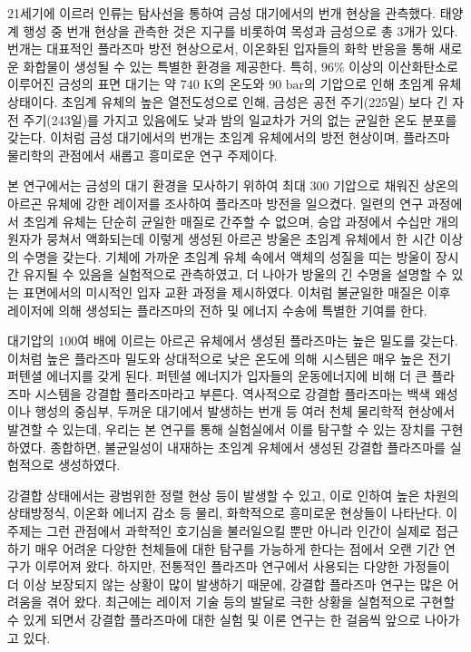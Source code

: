 
21세기에 이르러 인류는 탐사선을 통하여 금성 대기에서의 번개 현상을 관측했다. 태양계 행성 중 번개 현상을 관측한 것은 지구를 비롯하여 목성과 금성으로 총 3개가 있다. 번개는 대표적인 플라즈마 방전 현상으로서, 이온화된 입자들의 화학 반응을 통해 새로운 화합물이 생성될 수 있는 특별한 환경을 제공한다. 특히, $96\%$ 이상의 이산화탄소로 이루어진 금성의 표면 대기는 약 $740 \text{ K}$의 온도와 $90 \text{ bar}$의 기압으로 인해 초임계 유체 상태이다. 초임계 유체의 높은 열전도성으로 인해, 금성은 공전 주기(225일) 보다 긴 자전 주기(243일)를 가지고 있음에도 낮과 밤의 일교차가 거의 없는 균일한 온도 분포를 갖는다. 이처럼 금성 대기에서의 번개는 초임계 유체에서의 방전 현상이며, 플라즈마 물리학의 관점에서 새롭고 흥미로운 연구 주제이다.

본 연구에서는 금성의 대기 환경을 모사하기 위하여 최대 300 기압으로 채워진 상온의 아르곤 유체에 강한 레이저를 조사하여 플라즈마 방전을 일으켰다. 일련의 연구 과정에서 초임계 유체는 단순히 균일한 매질로 간주할 수 없으며, 승압 과정에서 수십만 개의 원자가 뭉쳐서 액화되는데 이렇게 생성된 아르곤 방울은 초임계 유체에서 한 시간 이상의 수명을 갖는다. 기체에 가까운 초임계 유체 속에서 액체의 성질을 띠는 방울이 장시간 유지될 수 있음을 실험적으로 관측하였고, 더 나아가 방울의 긴 수명을 설명할 수 있는 표면에서의 미시적인 입자 교환 과정을 제시하였다. 이처럼 불균일한 매질은 이후 레이저에 의해 생성되는 플라즈마의 전하 및 에너지 수송에 특별한 기여를 한다.

대기압의 100여 배에 이르는 아르곤 유체에서 생성된 플라즈마는 높은 밀도를 갖는다. 이처럼 높은 플라즈마 밀도와 상대적으로 낮은 온도에 의해 시스템은 매우 높은 전기 퍼텐셜 에너지를 갖게 된다. 퍼텐셜 에너지가 입자들의 운동에너지에 비해 더 큰 플라즈마 시스템을 강결합 플라즈마라고 부른다. 역사적으로 강결합 플라즈마는 백색 왜성이나 행성의 중심부, 두꺼운 대기에서 발생하는 번개 등 여러 천체 물리학적 현상에서 발견할 수 있는데, 우리는 본 연구를 통해 실험실에서 이를 탐구할 수 있는 장치를 구현하였다. 종합하면, 불균일성이 내재하는 초임계 유체에서 생성된 강결합 플라즈마를 실험적으로 생성하였다.

강결합 상태에서는 광범위한 정렬 현상 등이 발생할 수 있고, 이로 인하여 높은 차원의 상태방정식, 이온화 에너지 감소 등 물리, 화학적으로 흥미로운 현상들이 나타난다. 이 주제는 그런 관점에서 과학적인 호기심을 불러일으킬 뿐만 아니라 인간이 실제로 접근하기 매우 어려운 다양한 천체들에 대한 탐구를 가능하게 한다는 점에서 오랜 기간 연구가 이루어져 왔다. 하지만, 전통적인 플라즈마 연구에서 사용되는 다양한 가정들이 더 이상 보장되지 않는 상황이 많이 발생하기 때문에, 강결합 플라즈마 연구는 많은 어려움을 겪어 왔다. 최근에는 레이저 기술 등의 발달로 극한 상황을 실험적으로 구현할 수 있게 되면서 강결합 플라즈마에 대한 실험 및 이론 연구는 한 걸음씩 앞으로 나아가고 있다.

